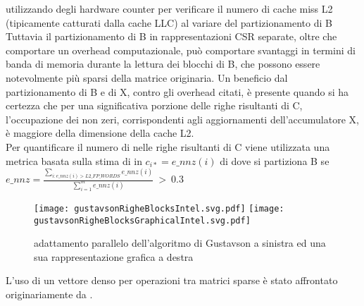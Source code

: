 utilizzando degli hardware counter per verificare il numero di cache miss L2
(tipicamente catturati dalla cache LLC) al variare del partizionamento di B %
\voidLine
Tuttavia il partizionamento di B in rappresentazioni CSR separate, 
oltre che comportare un overhead computazionale, può comportare svantaggi in
termini di banda di memoria durante la lettura dei blocchi di B, che possono
essere notevolmente più sparsi della matrice originaria. %
\voidLine
Un beneficio dal partizionamento di B e di X, contro gli overhead citati, è
presente quando si ha certezza che per una significativa porzione delle righe
risultanti di C, l'occupazione dei non zeri, corrispondenti agli aggiornamenti
dell'accumulatore X, è maggiore della dimensione della cache L2.\\
Per quantificare il numero di \nnz nelle righe risultanti di C viene utilizzata
una metrica basata sulla stima di \nnz in $c_{i*}=e\_nnz(i)$ di
\cite{intelSpMMDenseAccumulator} %
dove si partiziona B se
$e\_nnz = \frac{\sum\limits_{i:e\_nnz(i) > L2\_FP\_WORDS} e\_nnz(i)}
{\sum\limits_{i=1}^m e\_nnz(i)} ~>~0.3$\\
\begin{figure}[H]
	\centering
  		\texttt{[image: gustavsonRigheBlocksIntel.svg.pdf]}
  		\texttt{[image: gustavsonRigheBlocksGraphicalIntel.svg.pdf]} 
  		\caption[parallelizzazione Gustavson con accumulatore denso]
	    {adattamento parallelo dell'algoritmo di Gustavson a sinistra ed una sua rappresentazione grafica a destra}
	\decoRule \label{figCode:gustavsonRigheBlocksIntel} \label{fig:gustavsonRigheBlocksGraphicalIntel}
\end{figure}

L'uso di un vettore denso per operazioni tra matrici sparse è stato 
affrontato originariamente da \cite{SPA_mathlab}.\\

